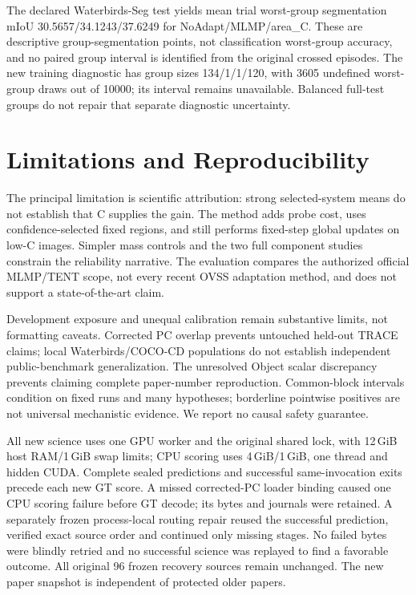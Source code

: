 \documentclass[10pt,twocolumn]{article}
\begin{document}
The declared Waterbirds-Seg test yields mean trial worst-group segmentation
mIoU 30.5657/34.1243/37.6249 for NoAdapt/MLMP/area\_C. These are descriptive
group-segmentation points, not classification worst-group accuracy, and no
paired group interval is identified from the original crossed episodes.
The new training diagnostic has group sizes 134/1/1/120, with 3605 undefined
worst-group draws out of 10000; its interval remains unavailable. Balanced
full-test groups do not repair that separate diagnostic uncertainty.

\section{Limitations and Reproducibility}
The principal limitation is scientific attribution: strong selected-system
means do not establish that C supplies the gain. The method adds probe cost,
uses confidence-selected fixed regions, and still performs fixed-step global
updates on low-C images. Simpler mass controls and the two full component
studies constrain the reliability narrative. The evaluation compares the
authorized official MLMP/TENT scope, not every recent OVSS adaptation method,
and does not support a state-of-the-art claim.

Development exposure and unequal calibration remain substantive limits, not
formatting caveats. Corrected PC overlap prevents untouched held-out TRACE
claims; local Waterbirds/COCO-CD populations do not establish independent
public-benchmark generalization. The unresolved Object scalar discrepancy
prevents claiming complete paper-number reproduction. Common-block intervals
condition on fixed runs and many hypotheses; borderline pointwise positives
are not universal mechanistic evidence. We report no causal safety guarantee.

All new science uses one GPU worker and the original shared lock, with
12\,GiB host RAM/1\,GiB swap limits; CPU scoring uses 4\,GiB/1\,GiB, one thread
and hidden CUDA. Complete sealed predictions and successful same-invocation
exits precede each new GT score. A missed corrected-PC loader binding caused
one CPU scoring failure before GT decode; its bytes and journals were retained.
A separately frozen process-local routing repair reused the successful
prediction, verified exact source order and continued only missing stages.
No failed bytes were blindly retried and no successful science was replayed
to find a favorable outcome. All original 96 frozen recovery sources remain
unchanged. The new paper snapshot is independent of protected older papers.
\end{document}
